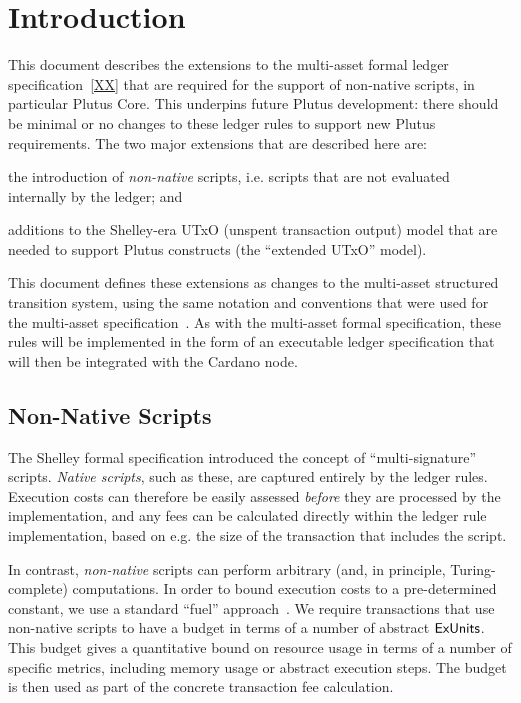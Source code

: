 \section{Introduction}


This document describes the extensions to the multi-asset formal ledger specification~\ref{XX}  that are
required for the support of non-native scripts, in particular Plutus Core. This underpins future Plutus development: there should be minimal or no changes to these ledger rules to support new Plutus requirements.
%
The two major extensions that are described here are:
\begin{inparaenum}
\item
the introduction
of \emph{non-native} scripts, i.e. scripts that are not evaluated internally by the ledger; and
\item
  additions to the Shelley-era UTxO (unspent transaction output) model that are needed to support Plutus
  constructs (the ``extended UTxO'' model).
\end{inparaenum}
This document defines these extensions as changes to the multi-asset structured transition system,
using the same notation and conventions that were used for the multi-asset specification~\cite{XX}.
As with the multi-asset formal specification, these rules will be implemented in the form of an executable ledger specification that will then be
integrated with the Cardano node.

\subsection{Non-Native Scripts}

The Shelley formal specification introduced the concept of ``multi-signature'' scripts.
\emph{Native scripts}, such as these, are captured entirely by the ledger rules.
Execution costs can therefore be easily assessed \emph{before} they are processed by the implementation,
and any fees can be calculated directly within the ledger rule implementation,
based on e.g. the size of the transaction that includes the script.

In contrast, \emph{non-native} scripts can perform arbitrary
(and, in principle, Turing-complete) computations.
In order to bound execution costs to a pre-determined constant, we use a standard ``fuel'' approach~\cite{XX}.
We require transactions that use non-native scripts
to have a budget in terms of a number of abstract $\mathsf{ExUnits}$.
This budget gives a quantitative bound on resource usage in terms of a number of specific metrics, including memory usage or abstract execution steps.
The budget is then used as part of the concrete transaction fee calculation.

